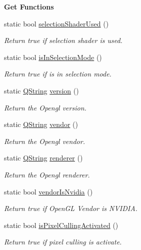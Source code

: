 \begin{Indent}{\bf Get Functions}
\begin{DoxyCompactItemize}
static bool \hyperlink{class_g_l_c___state_aaa7cd6c507a7f9837fef75fb1578a186}{selection\-Shader\-Used} ()
\begin{DoxyCompactList}\small\item\em Return true if selection shader is used. \end{DoxyCompactList}\item 
static bool \hyperlink{class_g_l_c___state_a25c6db67d0e21b592e3ef5467b7e753e}{is\-In\-Selection\-Mode} ()
\begin{DoxyCompactList}\small\item\em Return true if is in selection mode. \end{DoxyCompactList}\item 
static \hyperlink{group___u_a_v_objects_plugin_gab9d252f49c333c94a72f97ce3105a32d}{Q\-String} \hyperlink{class_g_l_c___state_aeb22307b643b8a66140e47f7f544dcef}{version} ()
\begin{DoxyCompactList}\small\item\em Return the Opengl version. \end{DoxyCompactList}\item 
static \hyperlink{group___u_a_v_objects_plugin_gab9d252f49c333c94a72f97ce3105a32d}{Q\-String} \hyperlink{class_g_l_c___state_a24ade18c0ab1ea4929db6b9183c877e8}{vendor} ()
\begin{DoxyCompactList}\small\item\em Return the Opengl vendor. \end{DoxyCompactList}\item 
static \hyperlink{group___u_a_v_objects_plugin_gab9d252f49c333c94a72f97ce3105a32d}{Q\-String} \hyperlink{class_g_l_c___state_a748deca0ca6dd816ff2ab3633ae3b0c4}{renderer} ()
\begin{DoxyCompactList}\small\item\em Return the Opengl renderer. \end{DoxyCompactList}\item 
static bool \hyperlink{class_g_l_c___state_ae302d8d81fd2976c6740446594b3dcc3}{vendor\-Is\-Nvidia} ()
\begin{DoxyCompactList}\small\item\em Return true if Open\-G\-L Vendor is N\-V\-I\-D\-I\-A. \end{DoxyCompactList}\item 
static bool \hyperlink{class_g_l_c___state_a74bc0c52431857e4058320ad68a1e808}{is\-Pixel\-Culling\-Activated} ()
\begin{DoxyCompactList}\small\item\em Return true if pixel culling is activate. \end{DoxyCompactList}\item 

\end{DoxyCompactItemize}
\end{Indent}
